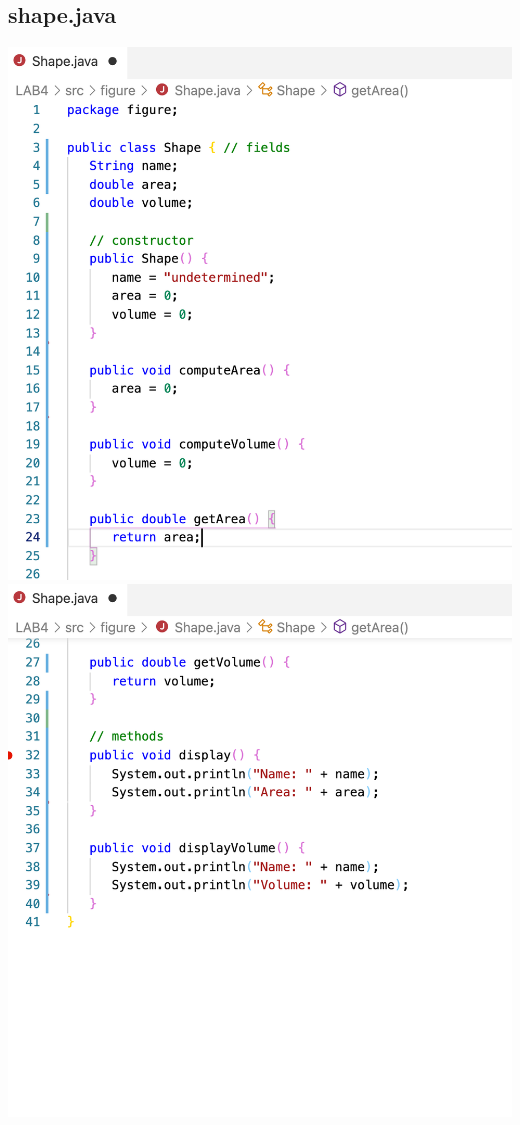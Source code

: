 \documentclass[hidelinks,12pt]{article}
\begin{document}
    \subsection{shape.java}
    \includegraphics[scale=0.4]{z_shape1.png}
    \includegraphics[scale=0.4]{z_shape2.png}
    
\end{document}
